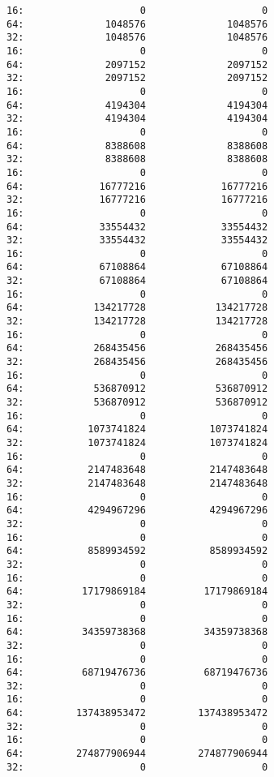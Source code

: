\documentclass[11pt]{article}
\begin{document}
\begin{verbatim}
16:                    0                    0
64:              1048576              1048576
32:              1048576              1048576
16:                    0                    0
64:              2097152              2097152
32:              2097152              2097152
16:                    0                    0
64:              4194304              4194304
32:              4194304              4194304
16:                    0                    0
64:              8388608              8388608
32:              8388608              8388608
16:                    0                    0
64:             16777216             16777216
32:             16777216             16777216
16:                    0                    0
64:             33554432             33554432
32:             33554432             33554432
16:                    0                    0
64:             67108864             67108864
32:             67108864             67108864
16:                    0                    0
64:            134217728            134217728
32:            134217728            134217728
16:                    0                    0
64:            268435456            268435456
32:            268435456            268435456
16:                    0                    0
64:            536870912            536870912
32:            536870912            536870912
16:                    0                    0
64:           1073741824           1073741824
32:           1073741824           1073741824
16:                    0                    0
64:           2147483648           2147483648
32:           2147483648           2147483648
16:                    0                    0
64:           4294967296           4294967296
32:                    0                    0
16:                    0                    0
64:           8589934592           8589934592
32:                    0                    0
16:                    0                    0
64:          17179869184          17179869184
32:                    0                    0
16:                    0                    0
64:          34359738368          34359738368
32:                    0                    0
16:                    0                    0
64:          68719476736          68719476736
32:                    0                    0
16:                    0                    0
64:         137438953472         137438953472
32:                    0                    0
16:                    0                    0
64:         274877906944         274877906944
32:                    0                    0

\end{verbatim}
\end{document}
